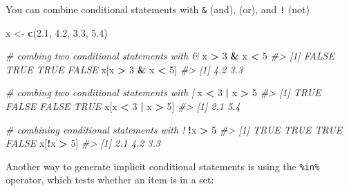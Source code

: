 \documentclass[]{book}
\newenvironment{Shaded}{\begin{snugshade}}{\end{snugshade}}
\newcommand{\CommentTok}[1]{\textcolor[rgb]{0.56,0.35,0.01}{\textit{#1}}}
\newcommand{\DecValTok}[1]{\textcolor[rgb]{0.00,0.00,0.81}{#1}}
\newcommand{\FloatTok}[1]{\textcolor[rgb]{0.00,0.00,0.81}{#1}}
\newcommand{\KeywordTok}[1]{\textcolor[rgb]{0.13,0.29,0.53}{\textbf{#1}}}
\newcommand{\NormalTok}[1]{#1}
\newcommand{\OperatorTok}[1]{\textcolor[rgb]{0.81,0.36,0.00}{\textbf{#1}}}
\newcommand{\StringTok}[1]{\textcolor[rgb]{0.31,0.60,0.02}{#1}}
\begin{document}
You can combine conditional statements with \texttt{\&} (and), \texttt{\textbar{}} (or), and \texttt{!} (not)

\begin{Shaded}
\begin{Highlighting}[]
\NormalTok{x <-}\StringTok{ }\KeywordTok{c}\NormalTok{(}\FloatTok{2.1}\NormalTok{, }\FloatTok{4.2}\NormalTok{, }\FloatTok{3.3}\NormalTok{, }\FloatTok{5.4}\NormalTok{)}

\CommentTok{# combing two conditional statements with &}
\NormalTok{x }\OperatorTok{>}\StringTok{ }\DecValTok{3} \OperatorTok{&}\StringTok{ }\NormalTok{x }\OperatorTok{<}\StringTok{ }\DecValTok{5}
\CommentTok{#> [1] FALSE  TRUE  TRUE FALSE}
\NormalTok{x[x }\OperatorTok{>}\StringTok{ }\DecValTok{3} \OperatorTok{&}\StringTok{ }\NormalTok{x }\OperatorTok{<}\StringTok{ }\DecValTok{5}\NormalTok{]}
\CommentTok{#> [1] 4.2 3.3}

\CommentTok{# combing two conditional statements with |}
\NormalTok{x }\OperatorTok{<}\StringTok{ }\DecValTok{3} \OperatorTok{|}\StringTok{ }\NormalTok{x }\OperatorTok{>}\StringTok{ }\DecValTok{5} 
\CommentTok{#> [1]  TRUE FALSE FALSE  TRUE}
\NormalTok{x[x }\OperatorTok{<}\StringTok{ }\DecValTok{3} \OperatorTok{|}\StringTok{ }\NormalTok{x }\OperatorTok{>}\StringTok{ }\DecValTok{5}\NormalTok{]}
\CommentTok{#> [1] 2.1 5.4}

\CommentTok{# combining conditional statements with !}
\OperatorTok{!}\NormalTok{x }\OperatorTok{>}\StringTok{ }\DecValTok{5} 
\CommentTok{#> [1]  TRUE  TRUE  TRUE FALSE}
\NormalTok{x[}\OperatorTok{!}\NormalTok{x }\OperatorTok{>}\StringTok{ }\DecValTok{5}\NormalTok{]}
\CommentTok{#> [1] 2.1 4.2 3.3}
\end{Highlighting}
\end{Shaded}

Another way to generate implicit conditional statements is using the \texttt{\%in\%} operator, which tests whether an item is in a set:

\begin{Shaded}
\end{Shaded}
\end{document}

